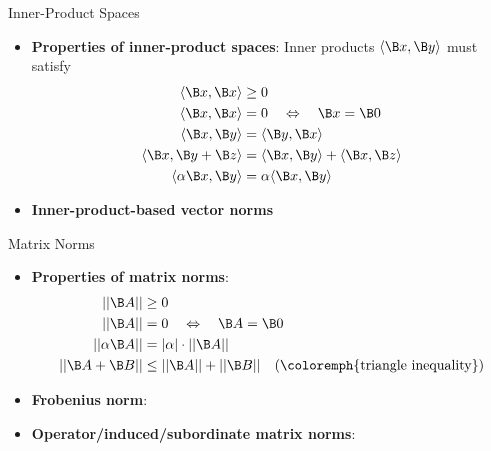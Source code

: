\begin{frame}{Inner-Product Spaces}

\begin{itemize}
\item {\bf Properties of inner-product spaces}:
%
    Inner products $\langle \B x, \B y \rangle$ must satisfy
    \begin{align*}
    \langle \B x, \B x\rangle  &\geq 0 \\
    \langle \B x, \B x\rangle &= 0  \quad\Leftrightarrow \quad\B x = \B 0 \\
    \langle \B x, \B y \rangle & =\langle \B y, \B x \rangle \\
    \langle \B x, \B y + \B z \rangle & =\langle \B x, \B y \rangle + \langle \B x, \B z \rangle\\
    \langle \alpha \B x, \B y \rangle & =\alpha \langle \B x, \B y \rangle 
    \end{align*}

\item {\bf Inner-product-based vector norms}



\end{itemize}
\end{frame}


\begin{frame}{Matrix Norms}


\begin{itemize}
\item {\bf Properties of matrix norms}:
    \begin{align*}
    ||\B A|| &\geq 0 \\
    ||\B A|| &= 0  \quad\Leftrightarrow \quad\B A = \B 0 \\
    ||\alpha \B A|| &= |\alpha|\cdot ||\B A|| \\
    ||\B A + \B B|| &\leq ||\B A|| + ||\B B||\quad \text{(\coloremph{triangle inequality})}
    \end{align*}
\item {\bf Frobenius norm}:
\item {\bf Operator/induced/subordinate matrix norms}:


\end{itemize}
\end{frame}


